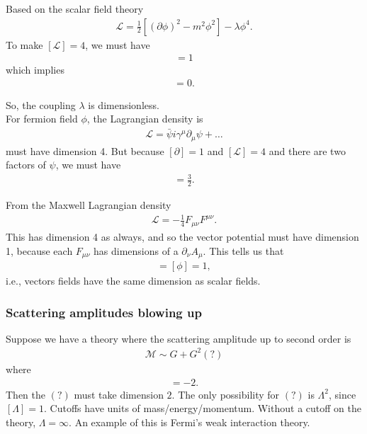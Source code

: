 \documentclass{book}
\theoremstyle{definition}
\newcommand{\p}{\partial}
\newcommand{\lag}{\mathcal{L}}
\newcommand{\f}[2]{\frac{#1}{#2}}
\begin{document}
Based on the scalar field theory
\begin{align}
\lag = \f{1}{2}[(\p\phi)^2 - m^2 \phi^2]  - \lambda \phi^4.
\end{align}
To make $[\lag] = 4$, we must have
\begin{align}
[\phi] = 1
\end{align}
which implies
\begin{align}
[\lambda] = 0.
\end{align}


So, the coupling $\lambda$ is dimensionless. \\


For fermion field $\phi$, the Lagrangian density is
\begin{align}
\lag = \bar{\psi} i \gamma^\mu \p_\mu \psi + \dots
\end{align}
must have dimension 4. But because $[\p] = 1$ and $[\lag] = 4$ and there are two factors of $\psi$, we must have
\begin{align}
[\psi] = \f{3}{2}.
\end{align} 


From the Maxwell Lagrangian density
\begin{align}
\lag = -\f{1}{4}F_{\mu\nu}F^{\mu\nu}.
\end{align}
This has dimension 4 as always, and so the vector potential must have dimension 1, because each $F_{\mu\nu}$ has dimensions of a $\p_\nu A_\mu$. This tells us that
\begin{align}
[A_\mu] = [\phi] = 1,
\end{align}
i.e., vectors fields have the same dimension as scalar fields.



\subsubsection{Scattering amplitudes blowing up}


Suppose we have a theory where the scattering amplitude up to second order is
\begin{align}
\mathcal{M} \sim G + G^2(?)
\end{align}
where
\begin{align}
[G] = -2.
\end{align}
Then the $(?)$ must take dimension $2$. The only possibility for $(?)$ is $\Lambda^2$, since $[\Lambda] = 1$. Cutoffs have units of mass/energy/momentum. Without a cutoff on the theory, $\Lambda = \infty$. An example of this is Fermi's weak interaction theory.
\end{document}
